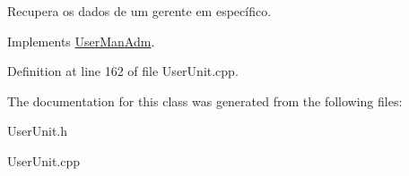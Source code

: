 Recupera os dados de um gerente em específico. 



Implements \hyperlink{classUserManAdm_a62e826d1c11061df021016e94e88f9ba}{User\-Man\-Adm}.



Definition at line 162 of file User\-Unit.\-cpp.



The documentation for this class was generated from the following files\-:\begin{DoxyCompactItemize}
\item 
User\-Unit.\-h\item 
User\-Unit.\-cpp\end{DoxyCompactItemize}
